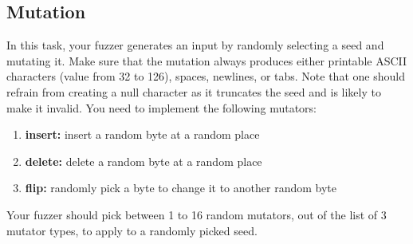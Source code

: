 \documentclass[letterpaper,11pt]{article}
\begin{document}

\subsection{Mutation}
In this task, your fuzzer generates an input by randomly selecting a seed and mutating it.
Make sure that the mutation always produces either printable ASCII characters (value from 32 to 126), spaces, newlines, or tabs.
Note that one should refrain from creating a null character as it truncates the seed and is likely to make it invalid.
You need to implement the following mutators:
\begin{enumerate}
    \item \textbf{insert:} insert a random byte at a random place
    \item \textbf{delete:} delete a random byte at a random place
    \item \textbf{flip:} randomly pick a byte to change it to another random byte
\end{enumerate}

Your fuzzer should pick between 1 to 16 random mutators, out of the list of 3 mutator types, to apply to a randomly picked seed.
\end{document}
